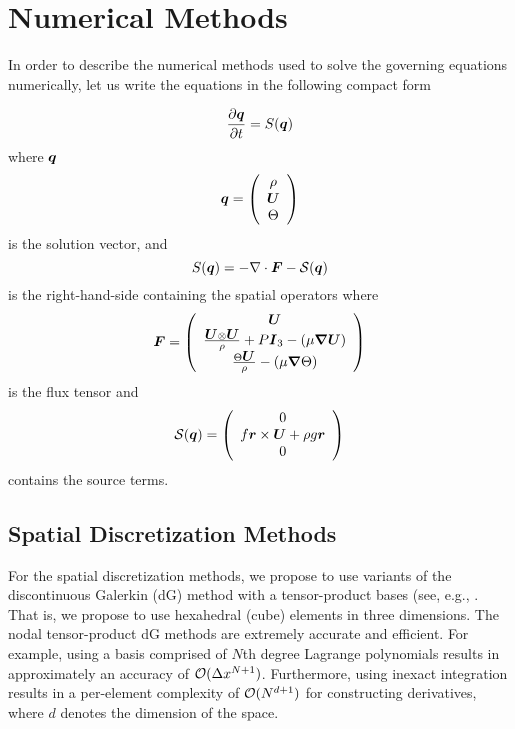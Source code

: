 \documentclass[12pt]{article}
\begin{document}

\section{Numerical Methods}
\label{sec:numerical_methods}

In order to describe the numerical methods used to solve the governing equations numerically, let us write the equations in the following compact form

\[
\frac{\partial \mbox{\boldmath$q$\unboldmath}}{\partial t} = S(\mbox{\boldmath$q$\unboldmath})
\]
where $\mbox{\boldmath$q$\unboldmath}$
\[
\mbox{\boldmath$q$\unboldmath}=\left( \begin{array}{c}
\rho \\
\mbox{\boldmath$U$\unboldmath} \\
\Theta
\end{array}
\right)
\]
 is the solution vector, 
 and 
 \[
 S(\mbox{\boldmath$q$\unboldmath}) = - \nabla \cdot \mbox{\boldmath$F$\unboldmath} - \mathcal{S}(\mbox{\boldmath$q$\unboldmath})
 \]
 is the right-hand-side containing the spatial operators where 
 \[
 \mbox{\boldmath$F$\unboldmath}=\left( \begin{array}{c}
 \mbox{\boldmath$U$\unboldmath} \\
 \frac{\mbox{\boldmath$U$\unboldmath} \otimes \mbox{\boldmath$U$\unboldmath}}{\rho} + P \mbox{\boldmath$I$\unboldmath}_3 - \left( \mu \mbox{\boldmath$\nabla$\unboldmath} \mbox{\boldmath$U$\unboldmath} \right) \\
\frac{\Theta \mbox{\boldmath$U$\unboldmath}}{\rho} - \left( \mu \mbox{\boldmath$\nabla$\unboldmath} \Theta \right)
\end{array}
\right)
 \]
 is the flux tensor and
 \[
 \mathcal{S}(\mbox{\boldmath$q$\unboldmath})=\left( \begin{array}{c}
 0 \\
 f \mbox{\boldmath$r$\unboldmath} \times \mbox{\boldmath$U$\unboldmath} + \rho g \mbox{\boldmath$r$\unboldmath} \\
0 
\end{array}
\right)
 \]
contains the source terms. 

\subsection{Spatial Discretization Methods}
For the spatial discretization methods, we propose to use variants of the discontinuous Galerkin (dG) method with a tensor-product bases (see, e.g., \cite{giraldo:2008a, abdi:2016}. That is, we propose to use hexahedral (cube) elements in three dimensions.  The nodal tensor-product dG methods are extremely accurate and efficient.  For example, using a basis comprised of $N$th degree Lagrange polynomials results in approximately an accuracy of $\mathcal{O}(\Delta x^{N+1})$. Furthermore, using inexact integration results in a per-element complexity of $\mathcal{O}(N^{d+1})$ for constructing derivatives, where $d$ denotes the dimension of the space. 
\end{document}

